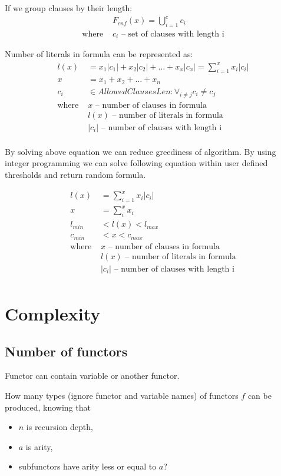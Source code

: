 If we group clauses by their length:
\begin{align*}
	&F_{cnf}(x) = \bigcup_{i=1}^c c_i \\
	\text{where }
		&c_i \text{ -- set of clauses with length i}
\end{align*}

Number of literals in formula can be represented as:
\begin{align*}
	l(x) &= x_1|c_1| + x_2|c_2| + \dots + x_x|c_x| = \sum_{i=1}^{x} x_i |c_i| \\
	x &= x_1 + x_2 + \dots + x_n \\
	c_i &\in AllowedClausesLen: \forall_{i \neq j} c_i \neq c_j  \\
	\text{where }
		&x \text{ -- number of clauses in formula} \\
		&l(x) \text{ -- number of literals in formula} \\
		&|c_i| \text{ -- number of clauses with length i} \\
\end{align*}

By solving above equation we can reduce greediness of algorithm. By using integer programming we can solve following equation within user defined thresholds and return random formula.

\begin{align*}
	l(x) &= \sum_{i=1}^{x} x_i |c_i| \\
	x &= \sum_i^x x_i \\
	l_{min} &< l(x) < l_{max} \\
	c_{min} &< x < c_{max} \\
	\text{where }
		&x \text{ -- number of clauses in formula} \\
		&l(x) \text{ -- number of literals in formula} \\
		&|c_i| \text{ -- number of clauses with length i} \\
\end{align*}

\section{Complexity}

\subsection{Number of functors}

Functor can contain variable or another functor.

How many types (ignore functor and variable names) of functors $f$ can be produced, knowing that
\begin{itemize}
	\item $n$ is recursion depth,
	\item $a$ is arity,
	\item subfunctors have arity less or equal to $a$?
\end{itemize}



